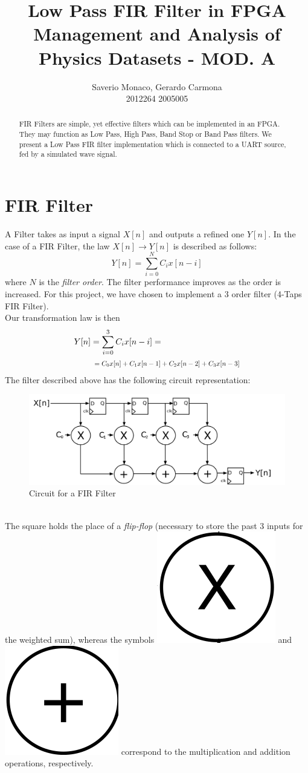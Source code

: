 \documentclass[11pt,a4paper,twocolumn]{IEEEtran}
\author{Saverio Monaco, Gerardo Carmona\\ 2012264\hspace{1.5cm} 2005005\\ \sepline}
\title{\textbf{Low Pass FIR Filter in FPGA}\\ Management and Analysis of Physics Datasets - MOD. A}
\newcommand*{\Scale}[2][4]{\scalebox{#1}{$#2$}}
\begin{document}
	\maketitle
	\begin{abstract}
		FIR Filters are simple, yet effective filters which can be implemented in an FPGA. They may function as Low Pass, High Pass, Band Stop or Band Pass filters. We present a Low Pass FIR filter implementation which is connected to a UART source, fed by a simulated wave signal.
	\end{abstract}
	\section{FIR Filter}
	A Filter takes as input a signal $X[n]$ and outputs a refined one $Y[n]$. In the case of a FIR Filter, the law $X[n]\to Y[n]$ is described as follows: 
	$$ Y[n] = \sum_{i=0}^N C_i x[n-i] $$
	where $N$ is the \textit{filter order}. The filter performance improves as the order is increased. For this project, we have chosen to implement a 3 order filter (4-Taps FIR Filter).\\ Our transformation law is then
	$$\begin{aligned} Y[n]&=\sum_{i=0}^3 C_ix[n-i]=\\ & \Scale[0.8]{\hspace*{.2cm}=C_0x[n]+C_1x[n-1]+C_2x[n-2]+C_3x[n-3]}\end{aligned}$$
	The filter described above has the following circuit representation:
	\begin{figure}[h]
		\centering
		\includegraphics[width=1\linewidth]{img/FIR_direct_svg}
		\caption{Circuit for a FIR Filter}
	\end{figure}\\
	The square holds the place of a \emph{flip-flop} (necessary to store the past 3 inputs for the weighted sum), whereas the symbols \includegraphics[width=0.05\linewidth]{img/x} and \includegraphics[width=0.05\linewidth]{img/+} correspond to the multiplication and addition operations, respectively.
\end{document}

